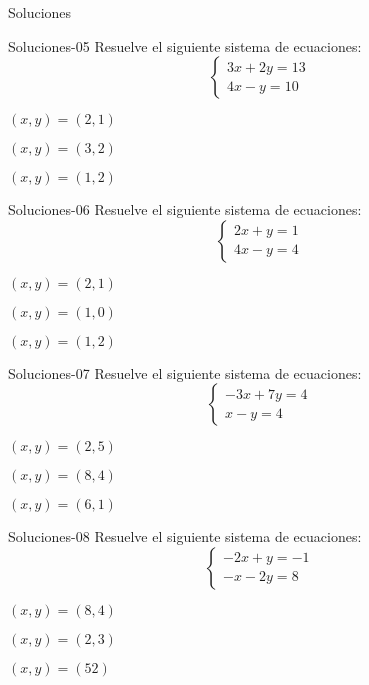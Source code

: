 \documentclass[a4,11pt]{aleph-notas}
\begin{document}
\begin{quiz}{Soluciones}
\begin{multi}[]%
    {Soluciones-05}
    Resuelve el siguiente sistema de ecuaciones:
    \[
    \begin{cases}
    3x + 2y = 13 \\
    4x - y = 10
    \end{cases}
    \]
    \item $(x, y) = (2, 1)$
    \item* $(x, y) = (3, 2)$
    \item $(x, y) = (1, 2)$
\end{multi}

\begin{multi}[]%
    {Soluciones-06}
    Resuelve el siguiente sistema de ecuaciones:
    \[
    \begin{cases}
    2x + y = 1 \\
    4x - y = 4
    \end{cases}
    \]
    \item $(x, y) = (2, 1)$
    \item* $(x, y) = (1, 0)$
    \item $(x, y) = (1, 2)$
\end{multi}

\begin{multi}[]%
    {Soluciones-07}
    Resuelve el siguiente sistema de ecuaciones:
    \[
    \begin{cases}
    -3x + 7y = 4 \\
    x - y = 4
    \end{cases}
    \]
    \item $(x, y) = (2, 5)$
    \item* $(x, y) = (8, 4)$
    \item $(x, y) = (6, 1)$
\end{multi}

\begin{multi}[]%
    {Soluciones-08}
    Resuelve el siguiente sistema de ecuaciones:
    \[
    \begin{cases}
    -2x + y = -1 \\
    -x - 2y = 8
    \end{cases}
    \]
    \item $(x, y) = (8, 4)$
    \item* $(x, y) = (2, 3)$
    \item $(x, y) = (5 2)$
\end{multi}


\end{quiz}
\end{document}

